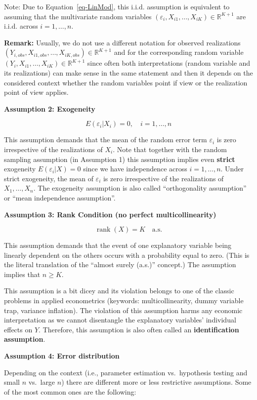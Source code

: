 \documentclass[
  letterpaper,
  DIV=11,
  numbers=noendperiod]{scrreprt}
\theoremstyle{definition}
\theoremstyle{plain}
\theoremstyle{plain}
\theoremstyle{remark}
\begin{document}
Note: Due to Equation~\ref{eq-LinMod}, this i.i.d. assumption is
equivalent to assuming that the multivariate random variables
\((\varepsilon_i,X_{i1},\dots,X_{iK})\in\mathbb{R}^{K+1}\) are i.i.d.
across \(i=1,\dots,n\).

\textbf{Remark:} Usually, we do not use a different notation for
observed realizations
\((Y_{i,obs},X_{i1,obs},\dots,X_{iK,obs})\in\mathbb{R}^{K+1}\) and for
the corresponding random variable
\((Y_{i},X_{i1},\dots,X_{iK})\in\mathbb{R}^{K+1}\) since often both
interpretations (random variable and its realizations) can make sense in
the same statement and then it depends on the considered context whether
the random variables point if view or the realization point of view
applies.

\textbf{Assumption 2: Exogeneity}

\[E(\varepsilon_i|X_i)=0,\quad i=1,\dots,n\]

This assumption demands that the mean of the random error term
\(\varepsilon_i\) is zero irrespective of the realizations of \(X_i\).
Note that together with the random sampling assumption (in Assumption 1)
this assumption implies even \textbf{strict} exogeneity
\(E(\varepsilon_i|X) = 0\) since we have independence across
\(i=1,\dots,n\). Under strict exogeneity, the mean of \(\varepsilon_i\)
is zero irrespective of the realizations of \(X_1,\dots,X_n\). The
exogeneity assumption is also called ``orthogonality assumption'' or
``mean independence assumption''.

\textbf{Assumption 3: Rank Condition (no perfect multicollinearity)}

\[\operatorname{rank}(X)=K\quad\text{a.s.}\]

This assumption demands that the event of one explanatory variable being
linearly dependent on the others occurs with a probability equal to
zero. (This is the literal translation of the ``almost surely (a.s.)''
concept.) The assumption implies that \(n\geq K\).

This assumption is a bit dicey and its violation belongs to one of the
classic problems in applied econometrics (keywords: multicollinearity,
dummy variable trap, variance inflation). The violation of this
assumption harms any economic interpretation as we cannot disentangle
the explanatory variables' individual effects on \(Y\). Therefore, this
assumption is also often called an \textbf{identification assumption}.

\textbf{Assumption 4: Error distribution}

Depending on the context (i.e., parameter estimation vs.~hypothesis
testing and small \(n\) vs.~large \(n\)) there are different more or
less restrictive assumptions. Some of the most common ones are the
following:
\end{document}
